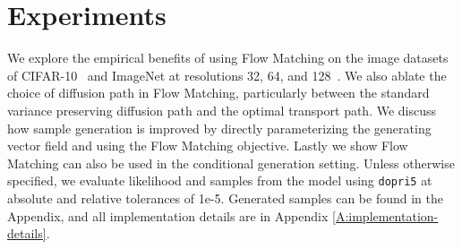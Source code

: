 \documentclass{article}
\begin{document}
\section{Experiments}

We explore the empirical benefits of using Flow Matching on the image datasets of  CIFAR-10~\citep{krizhevsky2009learning} and ImageNet at resolutions 32, 64, and 128~\citep{chrabaszcz2017downsampled,deng2009-imagenet}. We also ablate the choice of diffusion path in Flow Matching, particularly between the standard variance preserving diffusion path and the optimal transport path. 
%
We discuss how sample generation is improved by directly parameterizing the generating vector field and using the Flow Matching objective. Lastly we show Flow Matching can also be used in the conditional generation setting. Unless otherwise specified, we evaluate likelihood and samples from the model using \texttt{dopri5} \citep{dormand1980family} at absolute and relative tolerances of 1e-5. Generated samples can be found in the Appendix, and all implementation details are in Appendix \ref{A:implementation-details}.\vspace{-5pt}

\end{document}
